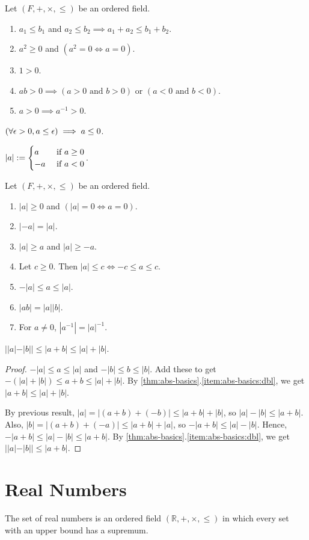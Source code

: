 \documentclass[a4paper, 12pt, fleqn]{article}
\begin{document}
\begin{lemma}
Let $(F, +, \times, \le)$ be an ordered field.
\begin{enumerate}
\item $a_1 \le b_1$ and $a_2 \le b_2 \implies a_1 + a_2 \le b_1 + b_2$.
\item $a^2 \ge 0$ and $(a^2 = 0 \iff a = 0)$.
\item $1 > 0$.
\item $ab > 0 \implies (a > 0 \textrm{ and } b > 0) \textrm{ or } (a < 0 \textrm{ and } b < 0)$.
\item $a > 0 \implies a^{-1} > 0$.
\end{enumerate}
\end{lemma}

\begin{lemma}
$(\forall \epsilon > 0, a \le \epsilon) \implies a \le 0$.
\end{lemma}

\begin{definition}
$\displaystyle |a| := \begin{cases} a & \textrm{ if } a \ge 0
\\ -a & \textrm{ if } a < 0 \end{cases}$.
\end{definition}

\begin{lemma}
\label{thm:abs-basics}
Let $(F, +, \times, \le)$ be an ordered field.
\begin{enumerate}
\item $|a| \ge 0$ and $(|a| = 0 \iff a = 0)$.
\item $|-a| = |a|$.
\item $|a| \ge a$ and $|a| \ge -a$.
\item \label{item:abs-basics:dbl}Let $c \ge 0$. Then $|a| \le c \iff -c \le a \le c$.
\item $-|a| \le a \le |a|$.
\item $|ab| = |a||b|$.
\item For $a \neq 0$, $|a^{-1}| = |a|^{-1}$.
\end{enumerate}
\end{lemma}

\begin{lemma}
$||a|-|b|| \le |a + b| \le |a| + |b|$.
\end{lemma}
\begin{proof}
$-|a| \le a \le |a|$ and $-|b| \le b \le |b|$.
Add these to get $-(|a|+|b|) \le a + b \le |a| + |b|$.
By \cref{thm:abs-basics}.\ref{item:abs-basics:dbl}, we get $|a + b| \le |a| + |b|$.

By previous result, $|a| = |(a+b) + (-b)| \le |a+b| + |b|$, so $|a|-|b| \le |a+b|$.
Also, $|b| = |(a+b) + (-a)| \le |a+b| + |a|$, so $-|a+b| \le |a|-|b|$.
Hence, $-|a+b| \le |a|-|b| \le |a+b|$.
By \cref{thm:abs-basics}.\ref{item:abs-basics:dbl}, we get $||a|-|b|| \le |a+b|$.
\end{proof}

\section{Real Numbers}

\begin{definition}
The set of real numbers is an ordered field $(\mathbb{R}, +, \times, \le)$
in which every set with an upper bound has a supremum.
\end{definition}
\end{document}
